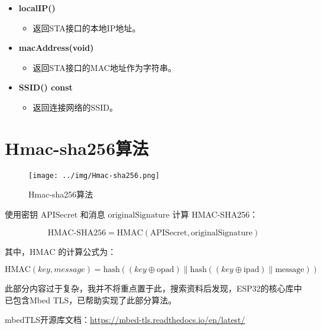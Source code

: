 \begin{itemize}
    \item \textbf{localIP()}
          \begin{itemize}
              \item 返回STA接口的本地IP地址。
          \end{itemize}

    \item \textbf{macAddress(void)}
          \begin{itemize}
              \item 返回STA接口的MAC地址作为字符串。
          \end{itemize}

    \item \textbf{SSID() const}
          \begin{itemize}
              \item 返回连接网络的SSID。
          \end{itemize}

\end{itemize}

\section{Hmac-sha256算法}

\begin{figure} [H]
    \centering
    \texttt{[image: ../img/Hmac-sha256.png]}
    \caption{Hmac-sha256算法}
    \label{fig:hmac-sha256}
\end{figure}

使用密钥 \(\text{APISecret}\) 和消息 \(\text{originalSignature}\) 计算 HMAC-SHA256：

\begin{equation}
    \text{HMAC-SHA256} = \text{HMAC}(\text{APISecret}, \text{originalSignature})
\end{equation}

其中，HMAC 的计算公式为：

\begin{equation}
    \text{HMAC}(key, message) = \text{hash}\left((key \oplus \text{opad}) \parallel \text{hash}\left((key \oplus \text{ipad}) \parallel \text{message}\right)\right)
\end{equation}

此部分内容过于复杂，我并不将重点置于此，搜索资料后发现，ESP32的核心库中已包含Mbed TLS，已帮助实现了此部分算法。

mbedTLS开源库文档：\href{https://mbed-tls.readthedocs.io/en/latest/}{\underline{https://mbed-tls.readthedocs.io/en/latest/}}

